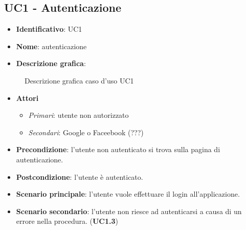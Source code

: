 
\subsection{UC1 - Autenticazione}
\begin{itemize}
  \item \textbf{Identificativo}: UC1
  \item \textbf{Nome}: autenticazione
  \item \textbf{Descrizione grafica}:
\end{itemize}

\begin{figure}[h]
  \centering
  \caption{Descrizione grafica caso d'uso UC1}
\end{figure}

\begin{itemize}
  \item \textbf{Attori}
        \begin{itemize}
          \item \textit{Primari}: utente non autorizzato
          \item \textit{Secondari}: Google o Faceebook (???)
        \end{itemize}
  \item \textbf{Precondizione}: l'utente non autenticato si trova sulla pagina di autenticazione.
  \item \textbf{Postcondizione}: l'utente è autenticato.
  \item \textbf{Scenario principale}: l'utente vuole effettuare il login all'applicazione.
  \item \textbf{Scenario secondario}: l'utente non riesce ad autenticarsi a causa di un errore nella procedura. (\textbf{UC1.3})
\end{itemize}

